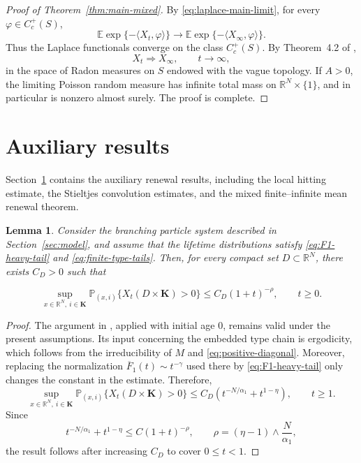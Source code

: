 \documentclass[reqno,final,11pt]{amsart}
\newcommand{\R}{\mathbb R}
\newcommand{\E}{\mathbb E}
\newcommand{\Pbb}{\mathbb P}
\newcommand{\Kk}{\mathbf K}
\newcommand{\ip}[2]{\langle #1,#2\rangle}
\theoremstyle{plain}
\newtheorem{lemma}[theorem]{Lemma}
\theoremstyle{definition}
\theoremstyle{remark}
\numberwithin{equation}{section}
\begin{document}
\begin{proof}[Proof of Theorem~\ref{thm:main-mixed}]
By \eqref{eq:laplace-main-limit}, for every \(\varphi\in C_c^+(S)\),
\[
  \E\exp\{-\ip{X_t}{\varphi}\}
  \longrightarrow
  \E\exp\{-\ip{X_\infty}{\varphi}\}.
\]
Thus the Laplace functionals converge on the class
\(C_c^+(S)\). By Theorem~4.2 of \cite{Olav},
\[
  X_t\Rightarrow X_\infty,\qquad t\to\infty,
\]
in the space of Radon measures on \(S\) endowed with the vague topology. If
\(A>0\), the limiting Poisson random measure has infinite total mass on
\(\R^N\times\{1\}\), and in particular is nonzero almost surely. The proof is
complete.


\end{proof}






\section{\texorpdfstring{Auxiliary results}{Auxiliary results}}\label{sec:auxiliary}

Section~\ref{sec:auxiliary} contains the auxiliary renewal results, including
the local hitting estimate, the Stieltjes convolution estimates, and the mixed
finite--infinite mean renewal theorem.



\begin{lemma}
\label{lem:local-hitting-kevei}
Consider the branching particle system described in Section~\ref{sec:model}, and assume that
the lifetime distributions satisfy \eqref{eq:F1-heavy-tail} and
\eqref{eq:finite-type-tails}. Then, for every compact set
\(D\subset\mathbb R^N\), there exists \(C_D>0\) such that


\begin{equation}\label{eq:hitting-bound}
  \sup_{x\in\R^N,\ i\in\Kk}
  \Pbb_{(x,i)}\{X_t(D\times\Kk)>0\}
  \le C_D(1+t)^{-\rho},
  \qquad t\ge0 .
\end{equation}
\end{lemma}
\begin{proof}
The argument in \cite[Lemma~11 and Section~4.3]{Kevei}, applied with initial age \(0\), remains valid under the present assumptions. Its input concerning the embedded type chain is ergodicity, which follows from the irreducibility of \(M\) and \eqref{eq:positive-diagonal}. Moreover, replacing the normalization \(\overline F_1(t)\sim t^{-\gamma}\) used there by \eqref{eq:F1-heavy-tail} only changes the constant in the estimate. Therefore,
\[
  \sup_{x\in\R^N,\ i\in\Kk}
  \Pbb_{(x,i)}\{X_t(D\times\Kk)>0\}
  \le C_D\left(t^{-N/\alpha_1}+t^{1-\eta}\right),
  \qquad t\ge1.
\]
Since
\[
  t^{-N/\alpha_1}+t^{1-\eta}
  \le C(1+t)^{-\rho},
  \qquad
  \rho=(\eta-1)\wedge\frac{N}{\alpha_1},
\]
the result follows after increasing \(C_D\) to cover \(0\le t<1\).
\end{proof}
\end{document}
